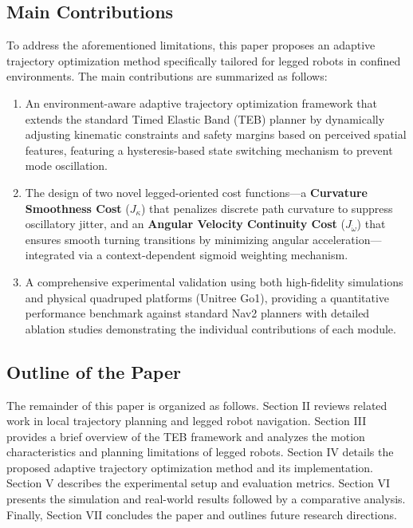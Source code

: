 \documentclass[lettersize,journal]{IEEEtran}
\begin{document}
\subsection{Main Contributions}
To address the aforementioned limitations, this paper proposes an adaptive trajectory optimization method specifically tailored for legged robots in confined environments. The main contributions are summarized as follows:
\begin{enumerate}
\item An environment-aware adaptive trajectory optimization framework that extends the standard Timed Elastic Band (TEB) planner \cite{rosmannTrajectoryOptimizationUsing2017} by dynamically adjusting kinematic constraints and safety margins based on perceived spatial features, featuring a hysteresis-based state switching mechanism to prevent mode oscillation.
\item The design of two novel legged-oriented cost functions---a \textbf{Curvature Smoothness Cost} ($J_{\kappa}$) that penalizes discrete path curvature to suppress oscillatory jitter, and an \textbf{Angular Velocity Continuity Cost} ($J_{\dot{\omega}}$) that ensures smooth turning transitions by minimizing angular acceleration---integrated via a context-dependent sigmoid weighting mechanism.
\item A comprehensive experimental validation using both high-fidelity simulations and physical quadruped platforms (Unitree Go1), providing a quantitative performance benchmark against standard Nav2 planners \cite{macenskiBenchmarkingLocalPlanners2024} with detailed ablation studies demonstrating the individual contributions of each module.
\end{enumerate}

\subsection{Outline of the Paper}
The remainder of this paper is organized as follows. Section II reviews related work in local trajectory planning and legged robot navigation. Section III provides a brief overview of the TEB framework and analyzes the motion characteristics and planning limitations of legged robots. Section IV details the proposed adaptive trajectory optimization method and its implementation. Section V describes the experimental setup and evaluation metrics. Section VI presents the simulation and real-world results followed by a comparative analysis. Finally, Section VII concludes the paper and outlines future research directions.
\end{document}
